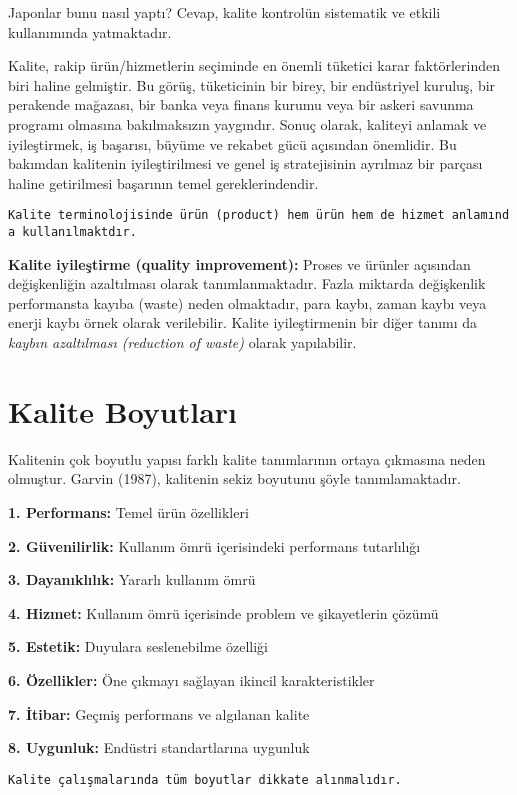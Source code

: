 \documentclass[
]{book}
\begin{document}
Japonlar bunu nasıl yaptı? Cevap, kalite kontrolün sistematik ve etkili kullanımında yatmaktadır.

Kalite, rakip ürün/hizmetlerin seçiminde en önemli tüketici karar faktörlerinden biri haline gelmiştir. Bu görüş, tüketicinin bir birey, bir endüstriyel kuruluş, bir perakende mağazası, bir banka veya finans kurumu veya bir askeri savunma programı olmasına bakılmaksızın yaygındır. Sonuç olarak, kaliteyi anlamak ve iyileştirmek, iş başarısı, büyüme ve rekabet gücü açısından önemlidir. Bu bakımdan kalitenin iyileştirilmesi ve genel iş stratejisinin ayrılmaz bir parçası haline getirilmesi başarının temel gereklerindendir.

\texttt{Kalite\ terminolojisinde\ ürün\ (product)\ hem\ ürün\ hem\ de\ hizmet\ anlamında\ kullanılmaktdır.}

\textbf{Kalite iyileştirme (quality improvement):} Proses ve ürünler açısından değişkenliğin azaltılması olarak tanımlanmaktadır. Fazla miktarda değişkenlik performansta kayıba (waste) neden olmaktadır, para kaybı, zaman kaybı veya enerji kaybı örnek olarak verilebilir. Kalite iyileştirmenin bir diğer tanımı da \emph{kaybın azaltılması (reduction of waste)} olarak yapılabilir.

\hypertarget{kalite-boyutlarux131}{%
\section{Kalite Boyutları}\label{kalite-boyutlarux131}}

Kalitenin çok boyutlu yapısı farklı kalite tanımlarının ortaya çıkmasına neden olmuştur. Garvin (1987), kalitenin sekiz boyutunu şöyle tanımlamaktadır.

\textbf{1. Performans:} Temel ürün özellikleri

\textbf{2. Güvenilirlik:} Kullanım ömrü içerisindeki performans tutarlılığı

\textbf{3. Dayanıklılık:} Yararlı kullanım ömrü

\textbf{4. Hizmet:} Kullanım ömrü içerisinde problem ve şikayetlerin çözümü

\textbf{5. Estetik:} Duyulara seslenebilme özelliği

\textbf{6. Özellikler:} Öne çıkmayı sağlayan ikincil karakteristikler

\textbf{7. İtibar:} Geçmiş performans ve algılanan kalite

\textbf{8. Uygunluk:} Endüstri standartlarına uygunluk

\begin{verbatim}
Kalite çalışmalarında tüm boyutlar dikkate alınmalıdır.
\end{verbatim}
\end{document}
